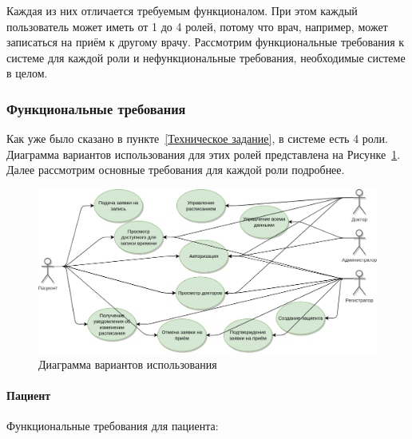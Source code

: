 \documentclass[a4paper,article]{article}
\begin{document}
\begin{sloppypar}
        Каждая из них отличается требуемым функционалом. При этом каждый пользователь может иметь от 1 до 4 ролей, потому что врач, например, может записаться на приём к другому врачу. Рассмотрим функциональные требования к системе для каждой роли и нефункциональные требования, необходимые системе в целом.

    \subsubsection{Функциональные требования}\label{ТЗ. Функциональные требования}

        Как уже было сказано в пункте~\ref{Техническое задание}, в системе есть 4 роли. Диаграмма вариантов использования для этих ролей представлена на Рисунке~\ref{fig:Диаграмма вариантов использования}. Далее рассмотрим основные требования для каждой роли подробнее.

        \begin{figure}[h]
            \centering
            \includegraphics[width=0.9\linewidth]{Диаграмма вариантов использования.png}
            \caption{\centering Диаграмма вариантов использования}
            \label{fig:Диаграмма вариантов использования}
        \end{figure}

    \paragraph{Пациент}\label{ТЗ. Пациент}

    Функциональные требования для пациента:


\end{sloppypar}
\end{document}
